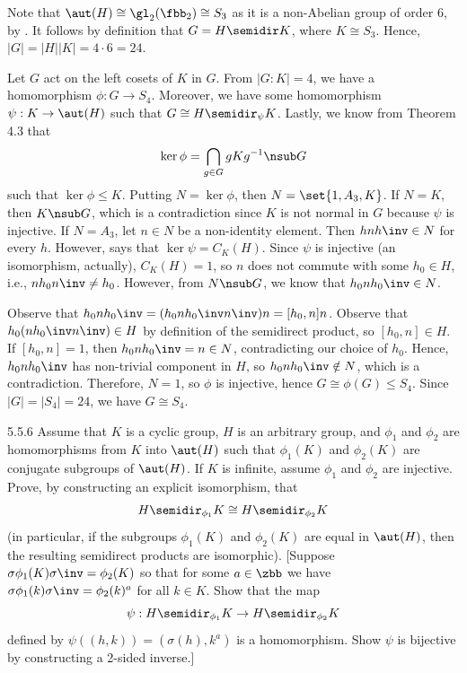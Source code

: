 \begin{solenum}
    \item Note that $\aut(H) \cong \gl_2(\fbb_2) \cong S_3$ as it is a non-Abelian group of order 6, by .
	It follows by definition that $G = H \semidir K$, where $K \cong S_3$.
	Hence, $|G| = |H||K| = 4 \cdot 6 = 24$.
    \item Let $G$ act on the left cosets of $K$ in $G$.
	From $|G : K| = 4$, we have a homomorphism $\phi : G \to S_4$.
	Moreover, we have some homomorphism $\psi : K \to \aut(H)$ such that $G \cong H \semidir_\psi K$.
	Lastly, we know from Theorem 4.3 that
    \[
    	\ker\phi = \bigcap_{g \in G} gKg^{-1} \nsub G
    \]
    such that $\ker\phi \leq K$.
	Putting $N = \ker\phi$, then $N = \set{1, A_3, K}$.
	If $N = K$, then $K \nsub G$, which is a contradiction since $K$ is not normal in $G$ because $\psi$ is injective.
	If $N = A_3$, let $n \in N$ be a non-identity element.
	Then $hnh\inv \in N$ for every $h$.
	However,  says that $\ker\psi = C_K(H)$.
	Since $\psi$ is injective (an isomorphism, actually), $C_K(H) = 1$, so $n$ does not commute with some $h_0 \in H$, i.e., $nh_0n\inv \neq h_0$.
	However, from $N \nsub G$, we know that $h_0nh_0\inv \in N$. 
    
    Observe that $h_0nh_0\inv = (h_0nh_0\inv n\inv)n = [h_0, n]n$.
	Observe that $h_0(nh_0\inv n\inv) \in H$ by definition of the semidirect product, so $[h_0, n] \in H$.
	If $[h_0, n] = 1$, then $h_0nh_0\inv = n \in N$, contradicting our choice of $h_0$.
	Hence, $h_0nh_0\inv$ has non-trivial component in $H$, so $h_0nh_0\inv \notin N$, which is a contradiction.
	Therefore, $N = 1$, so $\phi$ is injective, hence $G \cong \phi(G) \leq S_4$.
	Since $|G| = |S_4| = 24$, we have $G \cong S_4$.
\end{solenum}

\begin{spex}{5.5.6}
    Assume that $K$ is a cyclic group, $H$ is an arbitrary group, and $\phi_1$ and $\phi_2$ are homomorphisms from $K$ into $\aut(H)$ such that $\phi_1(K)$ and $\phi_2(K)$ are conjugate subgroups of $\aut(H)$.
	If $K$ is infinite, assume $\phi_1$ and $\phi_2$ are injective.
	Prove, by constructing an explicit isomorphism, that
    \[
    	H \semidir_{\phi_1} K \cong H \semidir_{\phi_2} K
    \]
    (in particular, if the subgroups $\phi_1(K)$ and $\phi_2(K)$ are equal in $\aut(H)$, then the resulting semidirect products are isomorphic). [Suppose $\sigma\phi_1(K)\sigma\inv = \phi_2(K)$ so that for some $a \in \zbb$ we have $\sigma\phi_1(k)\sigma\inv = \phi_2(k)^a$ for all $k \in K$.
	Show that the map
    \[
    	\psi : H \semidir_{\phi_1} K \to H \semidir_{\phi_2} K
    \]
    defined by $\psi((h,k)) = (\sigma(h), k^a)$ is a homomorphism.
	Show $\psi$ is bijective by constructing a 2-sided inverse.]
\end{spex}


